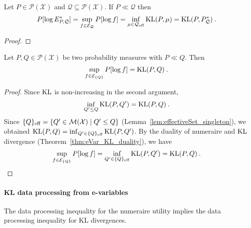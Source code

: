 \begin{theorem}\label{thm:eVar_KL_duality}
Let $P \in \mathcal{P}(\mathcal{X})$ and $\mathcal{Q} \subseteq \mathcal{P}(\mathcal{X})$.
If $P \ll \mathcal{Q}$ then
\begin{align*}
  P[\log E^*_{P, \mathcal{Q}}]
  = \sup_{f \in \mathcal{E}_{\mathcal{Q}}} P[\log f]
  = \inf_{\mu \in \mathcal{Q}_{\operatorname{eff}}} \operatorname{KL}(P, \mu)
  = \operatorname{KL}(P, P^*_{\mathcal{Q}})
  \: .
\end{align*}
\end{theorem}

\begin{proof}

\end{proof}


\begin{lemma}\label{lem:sup_eVar_singleton}
Let $P, Q \in \mathcal{P}(\mathcal{X})$ be two probability measures with $P \ll Q$.
Then
\begin{align*}
  \sup_{f \in \mathcal{E}_{\{Q\}}} P[\log f]
  = \operatorname{KL}(P, Q)
  \: .
\end{align*}
\end{lemma}

\begin{proof}
Since $\operatorname{KL}$ is non-increasing in the second argument,
\begin{align*}
  \inf_{Q' \le Q} \operatorname{KL}(P, Q') = \operatorname{KL}(P, Q) \: .
\end{align*}
Since $\{Q\}_{\operatorname{eff}} = \{Q' \in \mathcal{M}(\mathcal{X}) \mid Q' \le Q\}$ (Lemma~\ref{lem:effectiveSet_singleton}), we obtained $\operatorname{KL}(P, Q) = \inf_{Q' \in \{Q\}_{\operatorname{eff}}} \operatorname{KL}(P, Q')$.
By the duality of numeraire and $\operatorname{KL}$ divergence (Theorem~\ref{thm:eVar_KL_duality}), we have
\begin{align*}
  \sup_{f \in \mathcal{E}_{\{Q\}}} P[\log f]
  = \inf_{Q' \in \{Q\}_{\operatorname{eff}}} \operatorname{KL}(P, Q')
  = \operatorname{KL}(P, Q)
  \: .
\end{align*}
\end{proof}



\paragraph{KL data processing from e-variables}

The data processing inequality for the numeraire utility implies the data processing inequality for KL divergences.

